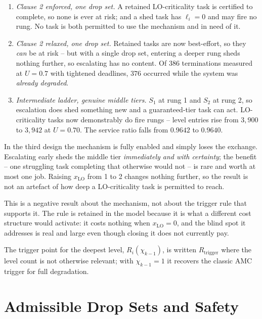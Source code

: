\begin{enumerate}
\item \emph{Clause 2 enforced, one drop set.} A retained LO-criticality task is
  certified to complete, so none is ever at risk; and a shed task has
  $\ell_i = 0$ and may fire no rung. No task is both permitted to use the
  mechanism and in need of it.
\item \emph{Clause 2 relaxed, one drop set.} Retained tasks are now
  best-effort, so they \emph{can} be at risk -- but with a single drop set,
  entering a deeper rung sheds nothing further, so escalating has no content.
  Of $386$ terminations measured at $U = 0.7$ with tightened deadlines, $376$
  occurred while the system was \emph{already degraded}.
\item \emph{Intermediate ladder, genuine middle tiers.} $S_1$ at rung 1 and
  $S_2$ at rung 2, so escalation does shed something new and a guaranteed-tier
  task can act. LO-criticality tasks now demonstrably do fire rungs -- level
  entries rise from $3{,}900$ to $3{,}942$ at $U = 0.70$. The service ratio
  falls from $0.9642$ to $0.9640$.
\end{enumerate}

\noindent In the third design the mechanism is fully enabled and simply loses
the exchange. Escalating early sheds the middle tier \emph{immediately and with
certainty}; the benefit -- one struggling task completing that otherwise would
not -- is rare and worth at most one job. Raising $x_{\mathrm{LO}}$ from 1 to 2
changes nothing further, so the result is not an artefact of how deep a
LO-criticality task is permitted to reach.

This is a negative result about the mechanism, not about the trigger rule that
supports it. The rule is retained in the model because it is what a different
cost structure would activate: it costs nothing when $x_{\mathrm{LO}} = 0$, and
the blind spot it addresses is real and large even though closing it does not
currently pay.

The trigger point for the deepest level, $R_i(\chi_{k-1})$, is written
$R_{\mathrm{trigger}}$ where the level count is not otherwise relevant; with
$\chi_{k-1} = 1$ it recovers the classic AMC trigger for full degradation.

\section{Admissible Drop Sets and Safety}
\label{sec:admissibility}

